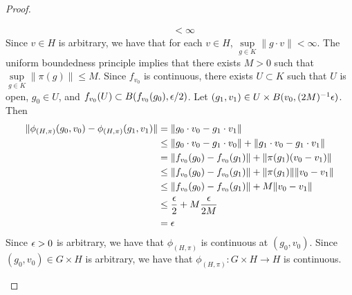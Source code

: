 \documentclass{book}
\begin{document}
\begin{proof}
\begin{enumerate}
\begin{align*}
				& < \infty
			\end{align*}  
			Since $v \in H$ is arbitrary, we have that for each $v \in H$, $\sup\limits_{g \in K} \|g \cdot v\| < \infty$. The uniform boundedness principle implies that  there exists $M > 0$ such that $\sup\limits_{g \in K} \| \pi(g) \| \leq M$. Since $f_{v_0}$ is continuous, there exists $U \subset K$ such that $U$ is open, $g_0 \in U$, and $f_{v_0}(U) \subset B(f_{v_0}(g_0), \epsilon/2)$. Let $(g_1, v_1) \in U \times B(v_0, (2M)^{-1} \epsilon)$. Then 
			\begin{align*}
				\|\phi_{(H, \pi)}(g_0, v_0) - \phi_{(H, \pi)}(g_1, v_1)\|
				& = \|g_0 \cdot v_0 - g_1 \cdot v_1\| \\
				& \leq 	\|g_0 \cdot v_0 - g_1 \cdot v_0\| + \|g_1 \cdot v_0 - g_1 \cdot v_1\| \\
				& = \|f_{v_0}(g_0) - f_{v_0}(g_1)\| + \|\pi(g_1)(v_0 - v_1)\| \\
				& \leq \|f_{v_0}(g_0) - f_{v_0}(g_1)\| + \|\pi(g_1)\| \|v_0 - v_1\| \\
				& \leq \|f_{v_0}(g_0) - f_{v_0}(g_1)\| + M \|v_0 - v_1\| \\
				& \leq \frac{\epsilon}{2} + M \frac{\epsilon}{2M} \\
				& = \epsilon
			\end{align*}
			Since $\epsilon > 0$ is arbitrary, we have that $\phi_{(H, \pi)}$ is continuous at $(g_0, v_0)$. Since $(g_0, v_0) \in G \times H$ is arbitrary, we have that $\phi_{(H, \pi)}: G \times H \rightarrow H$ is continuous.
		\end{enumerate}
	\end{proof}
	
	
	
	
	
	
	
	
	
	
	
	
	
	
	
	
	
	
	
	
	
	
	
	
	
	
	
	
	
	
	
	
	
	
	
	
	
	
	
	
	
	
	
\end{document}
